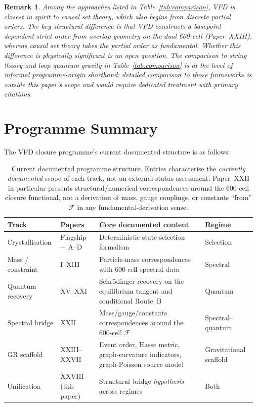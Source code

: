 \documentclass[12pt]{article}
\newtheorem{remark}[theorem]{Remark}
\newcommand{\Fcal}{\mathcal{F}}
\begin{document}
\begin{remark}
Among the approaches listed in Table~\ref{tab:comparison}, VFD is closest in spirit to causal set theory, which also begins from discrete partial orders. The key structural difference is that VFD constructs a basepoint-dependent strict order from overlap geometry on the dual 600-cell (Paper~XXIII), whereas causal set theory takes the partial order as fundamental. Whether this difference is physically significant is an open question. The comparison to string theory and loop quantum gravity in Table~\ref{tab:comparison} is at the level of informal programme-origin shorthand; detailed comparison to those frameworks is outside this paper's scope and would require dedicated treatment with primary citations.
\end{remark}

\section{Programme Summary}\label{sec:programme}

The VFD closure programme's current documented structure is as follows:

\begin{table}[ht]
\centering
\caption{Current documented programme structure. Entries characterise the \emph{currently documented} scope of each track, not an external status assessment. Paper~XXII in particular presents structural/numerical correspondences around the 600-cell closure functional, not a derivation of mass, gauge couplings, or constants ``from'' $\Fcal$ in any fundamental-derivation sense.}
\label{tab:programme}
\begin{tabular}{@{}llll@{}}
\toprule
Track & Papers & Core documented content & Regime \\
\midrule
Crystallisation & Flagship + A--D & Deterministic state-selection formalism & Selection \\
Mass / constraint & I--XIII & Particle-mass correspondences with 600-cell spectral data & Spectral \\
Quantum recovery & XV--XXI & Schr\"odinger recovery on the equilibrium tangent and conditional Route~B & Quantum \\
Spectral bridge & XXII & Mass/gauge/constants correspondences around the 600-cell $\Fcal$ & Spectral--quantum \\
GR scaffold & XXIII--XXVII & Event order, Hasse metric, graph-curvature indicators, graph-Poisson source model & Gravitational scaffold \\
Unification & XXVIII (this paper) & Structural bridge \emph{hypothesis} across regimes & Both \\
\bottomrule
\end{tabular}
\end{table}
\end{document}
